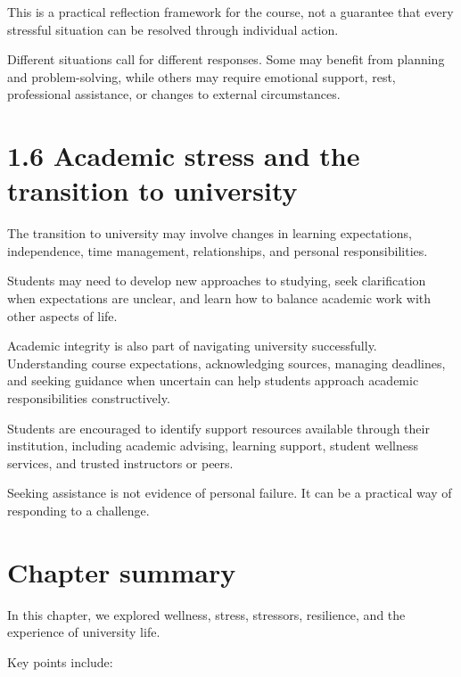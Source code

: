 \documentclass[
  letterpaper,
]{book}
\begin{document}
This is a practical reflection framework for the course, not a guarantee
that every stressful situation can be resolved through individual
action.

Different situations call for different responses. Some may benefit from
planning and problem-solving, while others may require emotional
support, rest, professional assistance, or changes to external
circumstances.

\section{1.6 Academic stress and the transition to
university}\label{academic-stress-and-the-transition-to-university}

The transition to university may involve changes in learning
expectations, independence, time management, relationships, and personal
responsibilities.

Students may need to develop new approaches to studying, seek
clarification when expectations are unclear, and learn how to balance
academic work with other aspects of life.

Academic integrity is also part of navigating university successfully.
Understanding course expectations, acknowledging sources, managing
deadlines, and seeking guidance when uncertain can help students
approach academic responsibilities constructively.

Students are encouraged to identify support resources available through
their institution, including academic advising, learning support,
student wellness services, and trusted instructors or peers.

Seeking assistance is not evidence of personal failure. It can be a
practical way of responding to a challenge.

\section{Chapter summary}\label{chapter-summary}

In this chapter, we explored wellness, stress, stressors, resilience,
and the experience of university life.

Key points include:
\end{document}
